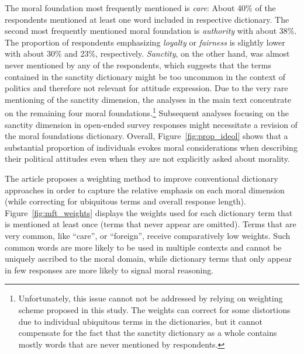 \documentclass[12pt]{article}
\begin{document}
The moral foundation most frequently mentioned is \textit{care}: About 40\% of the respondents mentioned at least one word included in respective dictionary. The second most frequently mentioned moral foundation is \textit{authority} with about 38\%. The proportion of respondents emphasizing \textit{loyalty} or \textit{fairness} is slightly lower with about 30\% and 23\%, respectively. \textit{Sanctity}, on the other hand, was almost never mentioned by any of the respondents, which suggests that the terms contained in the sanctity dictionary might be too uncommon in the context of politics and therefore not relevant for attitude expression. Due to the very rare mentioning of the sanctity dimension, the analyses in the main text concentrate on the remaining four moral foundations.\footnote{Unfortunately, this issue cannot not be addressed by relying on weighting scheme proposed in this study. The weights can correct for some distortions due to individual ubiquitous terms in the dictionaries, but it cannot compensate for the fact that the sanctity dictionary as a whole contains mostly words that are never mentioned by respondents.} Subsequent analyses focusing on the sanctity dimension in open-ended survey responses might necessitate a revision of the moral foundations dictionary. Overall, Figure~\ref{fig:prop_ideol} shows that a substantial proportion of individuals evokes moral considerations when describing their political attitudes even when they are not explicitly asked about morality.

The article proposes a weighting method to improve conventional dictionary approaches in order to capture the relative emphasis on each moral dimension (while correcting for ubiquitous terms and overall response length). Figure~\ref{fig:mft_weights} displays the weights used for each dictionary term that is mentioned at least once (terms that never appear are omitted). Terms that are very common, like ``care'', or ``foreign'', receive comparatively low weights. Such common words are more likely to be used in multiple contexts and cannot be uniquely ascribed to the moral domain, while %
dictionary terms that only appear in few responses are more likely to signal moral reasoning.
\end{document}
